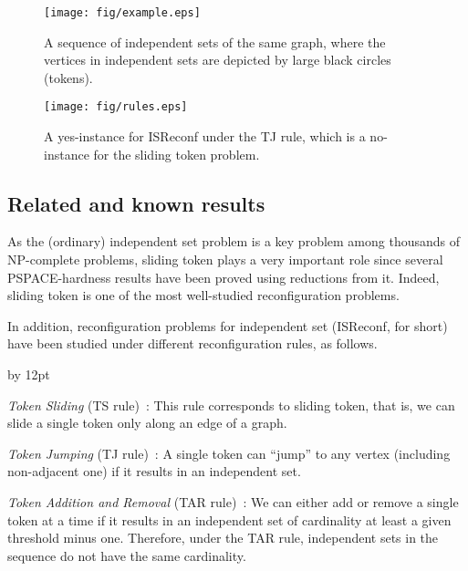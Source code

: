 \documentclass{llncs}
\newenvironment{listing}[1]{\begin{list}{*}{\settowidth{\labelwidth}{#1}\setlength{\leftmargin}{\labelwidth}\advance \leftmargin by 12pt
\setlength{\itemsep}{0pt}\setlength{\parsep}{0pt}\setlength{\topsep}{0pt}\setlength{\parskip}{0pt}}}{\end{list}}
\newcounter{one}
\begin{document}
\begin{figure}[t]
\begin{center}
\texttt{[image: fig/example.eps]}
\end{center}
\vspace{-1em}
\caption{A sequence  of independent sets of the same graph, where the vertices in independent sets are depicted by large black circles (tokens).}
\label{fig:example}
\end{figure}

\begin{figure}[b]
\begin{center}
\texttt{[image: fig/rules.eps]}
\end{center}
\vspace{-1em}
\caption{A yes-instance for {\sc ISReconf} under the TJ rule, 
which is a no-instance for the {\sc sliding token} problem.}
\label{fig:rules}
\end{figure}


\subsection{Related and known results}

As the (ordinary) {\sc independent set} problem is a key problem among thousands of NP-complete problems,
{\sc sliding token} plays a very important role since 
several PSPACE-hardness results have been proved using reductions from it.
Indeed, {\sc sliding token} is one of the most well-studied reconfiguration problems.  

	In addition, reconfiguration problems for {\sc independent set} ({\sc ISReconf}, for short) have been studied under different reconfiguration rules, as follows.
\smallskip

	\begin{listing}{aaa}
	\item[]{\em Token Sliding} (TS rule)~\cite{BC09,BKW14,HearnDemaine2005,HearnDemaine2009,KaminskiMedvedevMilanic2012,Wro14}: 
      This rule corresponds to {\sc sliding token}, that is, 
      we can slide a single token only along an edge of a graph.
							\smallskip
	
	\item[] {\em Token Jumping} (TJ rule)~\cite{BKW14,ItoKaminskiOnoSuzukiUeharaYamanaka2014,KaminskiMedvedevMilanic2012,Wro14}: 
      A single token can ``jump'' to any vertex (including non-adjacent one) 
      if it results in an independent set.
							\smallskip
							
	\item[] {\em Token Addition and Removal} (TAR rule)~\cite{BB14,Bon14,IDHPSUU,KaminskiMedvedevMilanic2012,MNRSS13,MNRW14,Wro14}: 
      We can either add or remove a single token at a time 
      if it results in an independent set of cardinality at least a given threshold minus one. 
      Therefore, under the TAR rule, independent sets in the sequence do not have the same cardinality.
	\end{listing}
\smallskip
\end{document}
